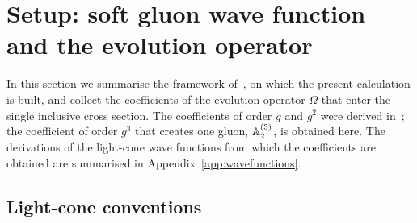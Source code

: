 \section{Setup: soft gluon wave function and the evolution operator}\label{sec:setup}

In this section we summarise the framework of~\cite{Radhakrishnan:2026soft}, on which the present calculation is built, and collect the coefficients of the evolution operator $\Omega$ that enter the single inclusive cross section. The coefficients of order $g$ and $g^2$ were derived in~\cite{Radhakrishnan:2026soft}; the coefficient of order $g^3$ that creates one gluon, $\mathbb{A}^{(3)}_2$, is obtained here. The derivations of the light-cone wave functions from which the coefficients are obtained are summarised in Appendix~\ref{app:wavefunctions}.

\subsection{Light-cone conventions}\label{sec:conventions}

